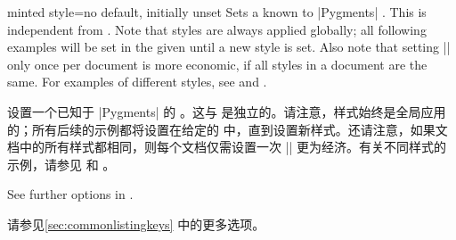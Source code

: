 \begin{docTcbKey}{minted style}{=}{no default, initially unset}
Sets a  known to |Pygments| . This is
independent from . Note that styles are always
applied globally; all following examples will be set in the given 
until a new style is set. Also note that
setting |\usemintedstyle| only once per document is more economic, if
all styles in a document are the same.
For examples of different styles, see
 and .

设置一个已知于 |Pygments|  的 。这与  是独立的。请注意，样式始终是全局应用的；所有后续的示例都将设置在给定的  中，直到设置新样式。还请注意，如果文档中的所有样式都相同，则每个文档仅需设置一次 |\usemintedstyle| 更为经济。有关不同样式的示例，请参见  和 。
\end{docTcbKey}

See further options in .

请参见\ref{sec:commonlistingkeys} 中的更多选项。